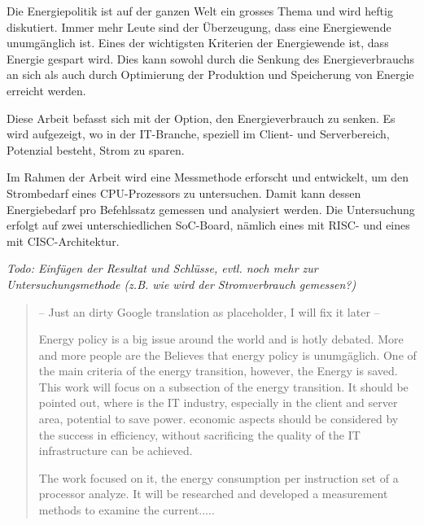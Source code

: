 \begin{zusammenfassung}

Die Energiepolitik ist auf der ganzen Welt ein grosses Thema und wird heftig diskutiert. Immer mehr Leute sind der Überzeugung, dass eine Energiewende unumgänglich ist. Eines der wichtigsten Kriterien der Energiewende ist, dass Energie gespart wird. Dies kann sowohl durch die Senkung des Energieverbrauchs an sich als auch durch Optimierung der Produktion und Speicherung von Energie erreicht werden.
\par
Diese Arbeit befasst sich mit der Option, den Energieverbrauch zu senken. Es wird aufgezeigt, wo in der IT-Branche, speziell im Client- und Serverbereich, Potenzial besteht, Strom zu sparen.
\par
Im Rahmen der Arbeit wird eine Messmethode erforscht und entwickelt, um den Strombedarf eines CPU-Prozessors zu untersuchen. Damit kann dessen Energiebedarf pro Befehlssatz gemessen und analysiert werden. Die Untersuchung erfolgt auf zwei unterschiedlichen SoC-Board, nämlich eines mit RISC- und eines mit CISC-Architektur.

\textit{Todo: Einfügen der Resultat und Schlüsse, evtl. noch mehr zur Untersuchungsmethode (z.B. wie wird der Stromverbrauch gemessen?)}


\end{zusammenfassung}

\begin{abstract} 

-- Just an dirty Google translation as placeholder, I will fix it later --
\par
Energy policy is a big issue around the world and is hotly debated. More and more people are the
Believes that energy policy is unumgäglich. One of the main criteria of the energy transition, however, the
Energy is saved. This work will focus on a subsection of the energy transition. It should be pointed out,
where is the IT industry, especially in the client and server area, potential to save power. economic aspects
should be considered by the success in efficiency, without sacrificing the quality of the IT infrastructure
can be achieved.
\par
The work focused on it, the energy consumption per instruction set of a processor
analyze. It will be researched and developed a measurement methods to examine the current.....

\end{abstract}
